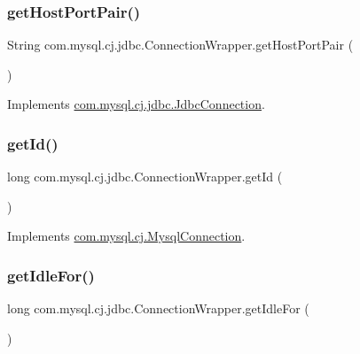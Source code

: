 \subsubsection{\texorpdfstring{get\+Host\+Port\+Pair()}{getHostPortPair()}}
{\footnotesize\ttfamily String com.\+mysql.\+cj.\+jdbc.\+Connection\+Wrapper.\+get\+Host\+Port\+Pair (\begin{DoxyParamCaption}{ }\end{DoxyParamCaption})}



Implements \mbox{\hyperlink{interfacecom_1_1mysql_1_1cj_1_1jdbc_1_1_jdbc_connection_aa0cc0cf69f201efa68eecad1d7a62eef}{com.\+mysql.\+cj.\+jdbc.\+Jdbc\+Connection}}.

\mbox{\label{classcom_1_1mysql_1_1cj_1_1jdbc_1_1_connection_wrapper_acedea8a5e36d279cb32705ee2a1b4d54}} 
\subsubsection{\texorpdfstring{get\+Id()}{getId()}}
{\footnotesize\ttfamily long com.\+mysql.\+cj.\+jdbc.\+Connection\+Wrapper.\+get\+Id (\begin{DoxyParamCaption}{ }\end{DoxyParamCaption})}



Implements \mbox{\hyperlink{interfacecom_1_1mysql_1_1cj_1_1_mysql_connection_aba5831e0b7016bc8b3fffa0c2e728fee}{com.\+mysql.\+cj.\+Mysql\+Connection}}.

\mbox{\label{classcom_1_1mysql_1_1cj_1_1jdbc_1_1_connection_wrapper_a4894df9d353212ae8b4e0860c15e6a6e}} 
\subsubsection{\texorpdfstring{get\+Idle\+For()}{getIdleFor()}}
{\footnotesize\ttfamily long com.\+mysql.\+cj.\+jdbc.\+Connection\+Wrapper.\+get\+Idle\+For (\begin{DoxyParamCaption}{ }\end{DoxyParamCaption})}

